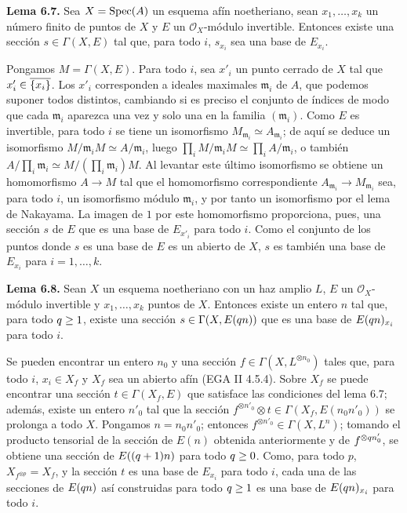 \textbf{Lema 6.7.} Sea $X=\Spec(A)$ un esquema afín noetheriano, sean $x_1,\ldots,x_k$ un número finito de puntos de $X$ y $E$ un $\mathcal O_X$-módulo invertible. Entonces existe una sección $s\in\Gamma(X,E)$ tal que, para todo $i$, $s_{x_i}$ sea una base de $E_{x_i}$.

Pongamos $M=\Gamma(X,E)$. Para todo $i$, sea $x'_i$ un punto cerrado de $X$ tal que $x'_i\in\sisi{\{x_i\}}{\overline{\{x_i\}}}$. Los $x'_i$ corresponden a ideales maximales $\mathfrak m_i$ de $A$, que podemos suponer todos distintos, cambiando si es preciso el conjunto de índices de modo que cada $\mathfrak m_i$ aparezca una vez y solo una en la familia $(\mathfrak m_i)$. Como $E$ es invertible, para todo $i$ se tiene un isomorfismo $M_{\mathfrak m_i}\simeq A_{\mathfrak m_i}$; de aquí se deduce un isomorfismo $M/\mathfrak m_iM\simeq A/\mathfrak m_i$, luego $\prod_i M/\mathfrak m_iM\simeq\prod_i A/\mathfrak m_i$, o también $A/\prod_i\mathfrak m_i\simeq M/(\prod_i\mathfrak m_i)M$. Al levantar este último isomorfismo se obtiene un homomorfismo $A\to M$ tal que el homomorfismo correspondiente $A_{\mathfrak m_i}\to M_{\mathfrak m_i}$ sea, para todo $i$, un isomorfismo módulo $\mathfrak m_i$, y por tanto un isomorfismo por el lema de Nakayama. La imagen de $1$ por este homomorfismo proporciona, pues, una sección $s$ de $E$ que es una base de $E_{x'_i}$ para todo $i$. Como el conjunto de los puntos donde $s$ es una base de $E$ es un abierto de $X$, $s$ es también una base de $E_{x_i}$ para $i=1,\ldots,k$.

\textbf{Lema 6.8.} Sean $X$ un esquema noetheriano con un haz amplio $L$, $E$ un $\mathcal O_X$-módulo invertible y $x_1,\ldots,x_k$ puntos de $X$. Entonces existe un entero $n$ tal que, para todo $\sisi{k}{q}\ge1$, existe una sección $s\in\Gamma(X,E(\sisi{k}{q}n))$ que es una base de $E(\sisi{k}{q}n)_{x_i}$ para todo $i$.

Se pueden encontrar un entero $n_0$ y una sección $f\in\Gamma(X,L^{\otimes n_0})$ tales que, para todo $i$, $x_i\in X_f$ y $X_f$ sea un abierto afín (EGA II 4.5.4). Sobre $X_f$ se puede encontrar una sección $t\in\Gamma(X_f,E)$ que satisface las condiciones del lema 6.7; además, existe un entero $n'_0$ tal que la sección $f^{\otimes n'_0}\otimes t\in\Gamma(X_f,E(n_0n'_0))$ se prolonga a todo $X$. Pongamos $n=n_0n'_0$; entonces $f^{\otimes n'_0}\in\Gamma(X,L^n)$; tomando el producto tensorial de la sección de $E(n)$ obtenida anteriormente y de $f^{\otimes \sisi{k}{q}n'_0}$, se obtiene una sección de $E((\sisi{k}{q}+1)n)$ para todo $\sisi{k}{q}\ge0$. Como, para todo $p$, $X_{f^{\otimes p}}=X_f$, y la sección $t$ es una base de $E_{x_i}$ para todo $i$, cada una de las secciones de $E(\sisi{k}{q}n)$ así construidas para todo $\sisi{k}{q}\ge1$ es una base de $E(\sisi{k}{q}n)_{x_i}$ para todo $i$.

